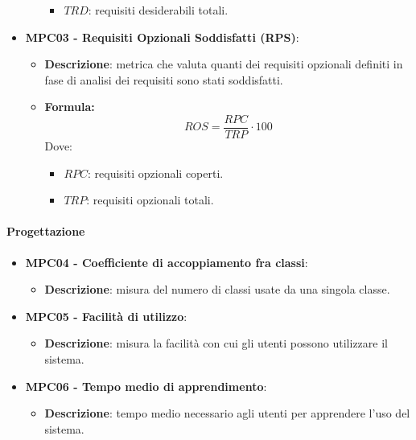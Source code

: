\documentclass[10pt]{article}
\begin{document}
\begin{justify}
\begin{itemize}
\begin{itemize}
\begin{itemize}
                            \item $TRD$: requisiti desiderabili totali.
                        \end{itemize}
            \end{itemize}
    \item   \textbf{MPC03 - Requisiti Opzionali Soddisfatti (RPS)}:
            \begin{itemize}
                \item   \textbf{Descrizione}: metrica che valuta quanti dei requisiti opzionali definiti in fase di analisi dei requisiti sono stati soddisfatti.
                \item   \textbf{Formula:}
                        \[
                        ROS = \frac{RPC}{TRP} \cdot 100
                        \]
                        Dove:
                        \begin{itemize}
                            \item $RPC$: requisiti opzionali coperti.
                            \item $TRP$: requisiti opzionali totali.
                        \end{itemize}
            \end{itemize}
\end{itemize}

\paragraph{Progettazione}
\begin{itemize}
    \item \textbf{MPC04 - Coefficiente di accoppiamento fra classi}:
        \begin{itemize}
            \item \textbf{Descrizione}: misura del numero di classi usate da una singola classe.
        \end{itemize}
    \item \textbf{MPC05 - Facilità di utilizzo}:
        \begin{itemize}
            \item \textbf{Descrizione}: misura la facilità con cui gli utenti possono utilizzare il sistema.
        \end{itemize}
    \item \textbf{MPC06 - Tempo medio di apprendimento}:
        \begin{itemize}
            \item \textbf{Descrizione}: tempo medio necessario agli utenti per apprendere l'uso del sistema.
        \end{itemize}
\end{itemize}


\end{justify}
\end{document}
